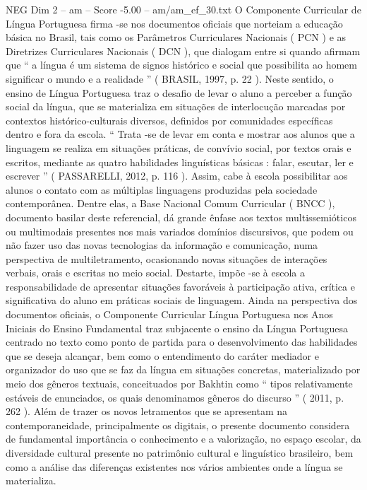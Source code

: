 \begin{textsample}{NEG Dim 2 – am – Score -5.00 – am/am\_ef\_30.txt}  \label{ex:f2_neg_131}
O Componente Curricular de Língua Portuguesa firma -se nos documentos oficiais que norteiam a educação básica no Brasil, tais como os Parâmetros Curriculares Nacionais ( PCN ) e as Diretrizes Curriculares Nacionais ( DCN ), que dialogam entre si quando afirmam que “ a língua é um sistema de signos histórico e social que possibilita ao homem significar o mundo e a realidade ” ( BRASIL, 1997, p. 22 ).
Neste sentido, o ensino de Língua Portuguesa traz o desafio de levar o aluno a perceber a função social da língua, que se materializa em situações de interlocução marcadas por contextos histórico-culturais diversos, definidos por comunidades específicas dentro e fora da escola. “ Trata -se de levar em conta e mostrar aos alunos que a linguagem se realiza em situações práticas, de convívio social, por textos orais e escritos, mediante as quatro habilidades linguísticas básicas : falar, escutar, ler e escrever ” ( PASSARELLI, 2012, p. 116 ).
Assim, cabe à escola possibilitar aos alunos o contato com as múltiplas linguagens produzidas pela sociedade contemporânea.
Dentre elas, a Base Nacional Comum Curricular ( BNCC ), documento basilar deste referencial, dá grande ênfase aos textos multissemióticos ou multimodais presentes nos mais variados domínios discursivos, que podem ou não fazer uso das novas tecnologias da informação e comunicação, numa perspectiva de multiletramento, ocasionando novas situações de interações verbais, orais e escritas no meio social.
Destarte, impõe -se à escola a responsabilidade de apresentar situações favoráveis à participação ativa, crítica e significativa do aluno em práticas sociais de linguagem.
Ainda na perspectiva dos documentos oficiais, o Componente Curricular Língua Portuguesa nos Anos Iniciais do Ensino Fundamental traz subjacente o ensino da Língua Portuguesa centrado no texto como ponto de partida para o desenvolvimento das habilidades que se deseja alcançar, bem como o entendimento do caráter mediador e organizador do uso que se faz da língua em situações concretas, materializado por meio dos gêneros textuais, conceituados por Bakhtin como “ tipos relativamente estáveis de enunciados, os quais denominamos gêneros do discurso ” ( 2011, p. 262 ).
Além de trazer os novos letramentos que se apresentam na contemporaneidade, principalmente os digitais, o presente documento considera de fundamental importância o conhecimento e a valorização, no espaço escolar, da diversidade cultural presente no patrimônio cultural e linguístico brasileiro, bem como a análise das diferenças existentes nos vários ambientes onde a língua se materializa.

\end{textsample}
